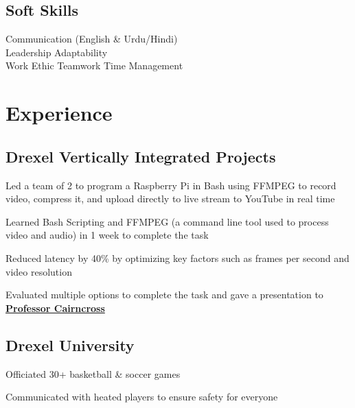 \documentclass[]{deedy-resume-openfont}
\begin{document}
\begin{minipage}[t]{0.33\textwidth}
\subsection{Soft Skills}
Communication (English \& Urdu/Hindi) \\ Leadership \textbullet{} Adaptability \\ Work Ethic \textbullet{} Teamwork \textbullet{} Time Management\\

%
%

\end{minipage} 
\hfill
\begin{minipage}[t]{0.66\textwidth} 


\section{Experience}

\subsection{Drexel Vertically Integrated Projects}
\vspace{\topsep} %
\begin{tightemize}
\item Led a team of 2 to program a Raspberry Pi in Bash using FFMPEG to record video, compress it, and upload directly to live stream to YouTube in real time
\item Learned Bash Scripting and FFMPEG (a command line tool used to process video and audio) in 1 week to complete the task
\item Reduced latency by 40\% by optimizing key factors such as frames per second and video resolution 
\item Evaluated multiple options to complete the task and gave a presentation to \textbf{\href{https://drexel.edu/engineering/about/faculty-staff/C/cairncross-richard/}{Professor Cairncross}}
\end{tightemize}
\sectionsep

\subsection{Drexel University}
\begin{tightemize}
\item Officiated 30+ basketball \& soccer games
\item Communicated with heated players to ensure safety for everyone
\end{tightemize}
\sectionsep



\end{minipage}
\end{document}
